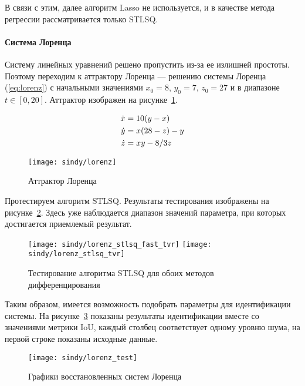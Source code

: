 В связи с этим, далее алгоритм Lasso не используется, и в качестве метода регрессии рассматривается только STLSQ.

\paragraph{Система Лоренца}

Систему линейных уравнений решено пропустить из-за ее излишней простоты. Поэтому переходим к аттрактору Лоренца --- решению системы Лоренца (\ref{eq:lorenz}) с начальными значениями $x_0 = 8$, $y_0 = 7$, $z_0 = 27$ и в диапазоне $t \in [0, 20]$. Аттрактор изображен на рисунке~\ref{fig:lorenz}.

\begin{equation}
\normalspacing
\begin{aligned}
\dot{x} &= 10 (y - x) \\
\dot{y} &= x (28 - z) - y \\
\dot{z} &= x y - 8/3 z
\end{aligned}
\label{eq:lorenz}
\end{equation}

\begin{figure}
\texttt{[image: sindy/lorenz]}
\caption{Аттрактор Лоренца}
\label{fig:lorenz}
\end{figure}

Протестируем алгоритм STLSQ. Результаты тестирования изображены на рисунке~\ref{fig:lorenz:stlsq}. Здесь уже наблюдается диапазон значений параметра, при которых достигается приемлемый результат.

\begin{figure}
\texttt{[image: sindy/lorenz\_stlsq\_fast\_tvr]}\hfill
\texttt{[image: sindy/lorenz\_stlsq\_tvr]}
\caption{Тестирование алгоритма STLSQ для обоих методов дифференцирования}
\label{fig:lorenz:stlsq}
\end{figure}

Таким образом, имеется возможность подобрать параметры для идентификации системы. На рисунке~\ref{fig:lorenz:test} показаны результаты идентификации вместе со значениями метрики IoU, каждый столбец соответствует одному уровню шума, на первой строке показаны исходные данные.

\begin{figure}
\texttt{[image: sindy/lorenz\_test]}
\caption{Графики восстановленных систем Лоренца}
\label{fig:lorenz:test}
\end{figure}


